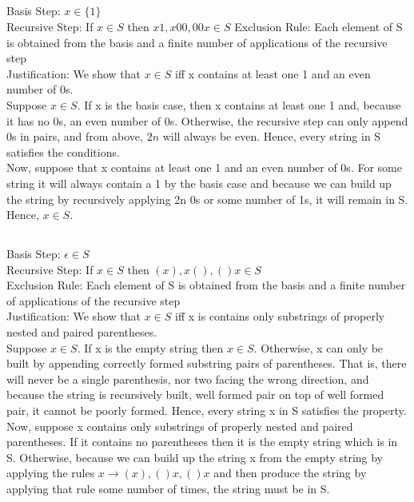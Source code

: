 \documentclass[11pt]{article}
\def\imp{\rightarrow}
\begin{document}
\subsection{} %
Basis Step: $x \in \{1\}$ \\
Recursive Step: If $x \in S$ then $x1, x00, 00x \in S$
Exclusion Rule: Each element of S is obtained from the basis and a finite number of applications of the recursive step\\
Justification: We show that $x \in S$ iff x contains at least one 1 and an even number of 0s. \\

Suppose $x \in S$. If x is the basis case, then x contains at least one 1 and, because it has no 0s, an even number of 0s. Otherwise, the recursive step can only append 0s in pairs, and from above, $2n$ will always be even. Hence, every string in S satisfies the conditions. \\

Now, suppose that x contains at least one 1 and an even number of 0s. For some string it will always contain a 1 by the basis case and because we can build up the string by recursively applying 2n 0s or some number of 1s, it will remain in S. Hence, $x \in S$. 

\subsection{} %
Basis Step: $\epsilon \in S$ \\
Recursive Step: If $x \in S$ then $(x), x(),()x \in S$ \\
Exclusion Rule: Each element of S is obtained from the basis and a finite number of applications of the recursive step\\
Justification: We show that $x \in S$ iff x is contains only substrings of properly nested and paired parentheses. \\

Suppose $x \in S$. If x is the empty string then $x \in S$. Otherwise, x can only be built by appending correctly formed substring pairs of parentheses. That is, there will never be a single parenthesis, nor two facing the wrong direction, and because the string is recursively built, well formed pair on top of well formed pair, it cannot be poorly formed. Hence, every string x in S satisfies the property. \\

Now, suppose x contains only substrings of properly nested and paired parentheses. If it contains no parentheses then it is the empty string which is in S. Otherwise, because we can build up the string x from the empty string by applying the rules $x \imp (x),()x,()x$ and then produce the string by applying that rule some number of times, the string must be in S. 
\end{document}
